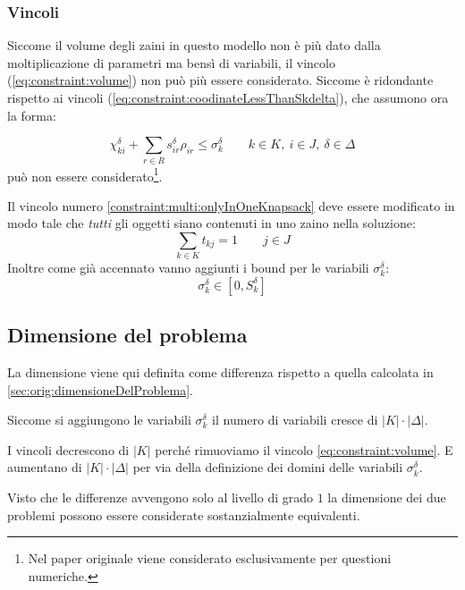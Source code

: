 \documentclass{scrartcl}
\begin{document}
\subsubsection{Vincoli}
Siccome il volume degli zaini in questo modello non è più dato dalla moltiplicazione di parametri ma bensì di variabili, il vincolo
(\ref{eq:constraint:volume}) non può più essere considerato. Siccome è ridondante rispetto ai vincoli (\ref{eq:constraint:coodinateLessThanSkdelta}), che assumono ora la forma:

\begin{equation}
\label{eq:constraint:coodinateLessThanSigmakdelta}
\chi_{ki}^\delta + \sum_{r \in R} s_{ir}^\delta \rho_{ir} \leq \sigma_k^\delta \quad \quad k \in K,\ i \in J,\ \delta \in \Delta
\end{equation}
può non essere considerato\footnote{Nel paper originale viene considerato esclusivamente per questioni numeriche.}.

Il vincolo numero \ref{constraint:multi:onlyInOneKnapsack} deve essere modificato in modo tale che \emph{tutti} gli oggetti siano contenuti in uno zaino nella soluzione:
\begin{equation}
\label{constraint:multi:onlyInExactlyOneKnapsack}
\sum_{k \in K} t_{kj} = 1 \quad \quad j \in J
\end{equation}
Inoltre come già accennato vanno aggiunti i bound per le variabili $\sigma_k^\delta$:
\begin{equation}
\sigma_k^\delta \in [ 0, S_k^\delta ]
\end{equation}

\subsection{Dimensione del problema}

La dimensione viene qui definita come differenza rispetto a quella calcolata in \ref{sec:orig:dimensioneDelProblema}.

Siccome si aggiungono le variabili $\sigma_k^\delta$ il numero di variabili cresce di $|K|\cdot|\Delta|$.


I vincoli decrescono di $|K|$ perché rimuoviamo il vincolo \ref{eq:constraint:volume}. E aumentano di $|K|\cdot|\Delta|$ per via della definizione dei domini delle variabili $\sigma_k^\delta$.

Visto che le differenze avvengono solo al livello di grado $1$ la dimensione dei due problemi possono essere considerate sostanzialmente equivalenti.
\end{document}
